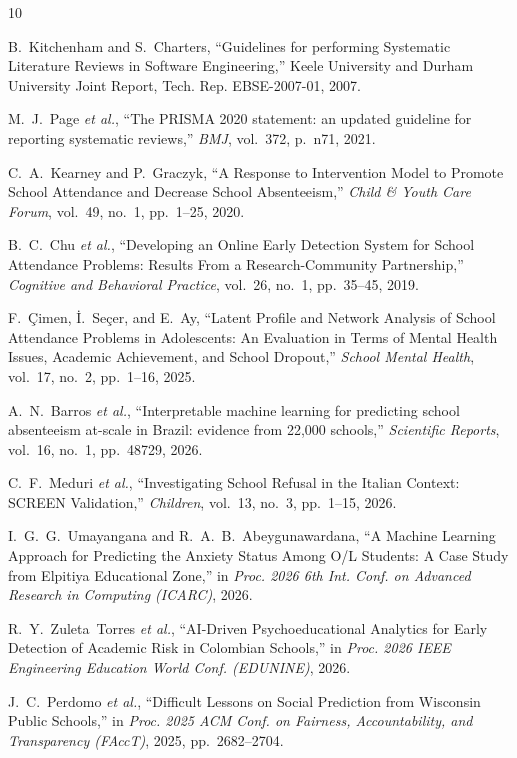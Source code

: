 \documentclass[journal,10pt,a4paper]{IEEEtran}
\begin{document}

\begin{thebibliography}{10}\footnotesize
\setlength{\itemsep}{0pt plus 0.2ex}

B.~Kitchenham and S.~Charters, ``Guidelines for performing Systematic Literature Reviews in Software Engineering,'' Keele University and Durham University Joint Report, Tech. Rep. EBSE-2007-01, 2007.

M.~J.~Page \textit{et al.}, ``The PRISMA 2020 statement: an updated guideline for reporting systematic reviews,'' \textit{BMJ}, vol.~372, p.~n71, 2021.

C.~A.~Kearney and P.~Graczyk, ``A Response to Intervention Model to Promote School Attendance and Decrease School Absenteeism,'' \textit{Child \& Youth Care Forum}, vol.~49, no.~1, pp.~1--25, 2020.

B.~C.~Chu \textit{et al.}, ``Developing an Online Early Detection System for School Attendance Problems: Results From a Research-Community Partnership,'' \textit{Cognitive and Behavioral Practice}, vol.~26, no.~1, pp.~35--45, 2019.

F.~{\c{C}}imen, {\.I}.~Se{\c{c}}er, and E.~Ay, ``Latent Profile and Network Analysis of School Attendance Problems in Adolescents: An Evaluation in Terms of Mental Health Issues, Academic Achievement, and School Dropout,'' \textit{School Mental Health}, vol.~17, no.~2, pp.~1--16, 2025.

A.~N.~Barros \textit{et al.}, ``Interpretable machine learning for predicting school absenteeism at-scale in Brazil: evidence from 22,000 schools,'' \textit{Scientific Reports}, vol.~16, no.~1, pp.~48729, 2026.

C.~F.~Meduri \textit{et al.}, ``Investigating School Refusal in the Italian Context: SCREEN Validation,'' \textit{Children}, vol.~13, no.~3, pp.~1--15, 2026.

I.~G.~G.~Umayangana and R.~A.~B.~Abeygunawardana, ``A Machine Learning Approach for Predicting the Anxiety Status Among O/L Students: A Case Study from Elpitiya Educational Zone,'' in \textit{Proc. 2026 6th Int. Conf. on Advanced Research in Computing (ICARC)}, 2026.

R.~Y.~Zuleta~Torres \textit{et al.}, ``AI-Driven Psychoeducational Analytics for Early Detection of Academic Risk in Colombian Schools,'' in \textit{Proc. 2026 IEEE Engineering Education World Conf. (EDUNINE)}, 2026.

J.~C.~Perdomo \textit{et al.}, ``Difficult Lessons on Social Prediction from Wisconsin Public Schools,'' in \textit{Proc. 2025 ACM Conf. on Fairness, Accountability, and Transparency (FAccT)}, 2025, pp.~2682--2704.

\end{thebibliography}
\end{document}
